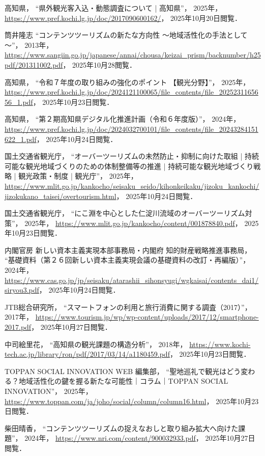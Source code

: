 \documentclass{docs}
\begin{document}
\begin{thebibliography}{99}
	高知県，
	“県外観光客入込・動態調査について | 高知県”，
	2025年，
	\url{https://www.pref.kochi.lg.jp/doc/2017090600162/}，
	2025年10月20日閲覧．

	筒井隆志
	“コンテンツツーリズムの新たな方向性 ～地域活性化の手法として～”，
	2013年，
	\url{https://www.sangiin.go.jp/japanese/annai/chousa/keizai_prism/backnumber/h25pdf/201311002.pdf}，
	2025年10月28閲覧．

	高知県，
	“令和７年度の取り組みの強化のポイント 【観光分野】”，
	2025年，
	\url{https://www.pref.kochi.lg.jp/doc/2024121100065/file_contents/file_2025231165656_1.pdf}，
	2025年10月23日閲覧．

	高知県，
	“第２期高知県デジタル化推進計画（令和６年度版）”，
	2024年，
	\url{https://www.pref.kochi.lg.jp/doc/2024032700101/file_contents/file_20243284151622_1.pdf}，
	2025年10月24日閲覧．

	国土交通省観光庁，
	“オーバーツーリズムの未然防止・抑制に向けた取組 | 持続可能な観光地域づくりのための体制整備等の推進 | 持続可能な観光地域づくり戦略 | 観光政策・制度 | 観光庁”，
	2025年，
	\url{https://www.mlit.go.jp/kankocho/seisaku_seido/kihonkeikaku/jizoku_kankochi/jizokukano_taisei/overtourism.html}，
	2025年10月24日閲覧．

	国土交通省観光庁，
	“にこ淵を中心とした仁淀川流域のオーバーツーリズム対策”，
	2025年，
	\url{https://www.mlit.go.jp/kankocho/content/001878840.pdf}，
	2025年10月23日閲覧．

	内閣官房 新しい資本主義実現本部事務局・内閣府 知的財産戦略推進事務局，
	“基礎資料（第２６回新しい資本主義実現会議の基礎資料の改訂・再編版）”，
	2024年，
	\url{https://www.cas.go.jp/jp/seisaku/atarashii_sihonsyugi/wgkaisai/contents_dai1/siryou3.pdf}，
	2025年10月24日閲覧．

	JTB総合研究所，
	“スマートフォンの利用と旅行消費に関する調査（2017）”，
	2017年，
	\url{https://www.tourism.jp/wp/wp-content/uploads/2017/12/smartphone-2017.pdf}，
	2025年10月27日閲覧．

	中司絵里花，
	“高知県の観光課題の構造分析”，
	2018年，
	\url{https://www.kochi-tech.ac.jp/library/ron/pdf/2017/03/14/a1180459.pdf}，
	2025年10月23日閲覧．

	TOPPAN SOCIAL INNOVATION WEB 編集部，
	“聖地巡礼で観光はどう変わる？地域活性化の鍵を握る新たな可能性｜コラム｜TOPPAN SOCIAL INNOVATION”，
	2025年，
	\url{https://www.toppan.com/ja/joho/social/column/column16.html}，
	2025年10月23日閲覧．

	柴田晴香，
	“コンテンツツーリズムの捉えなおしと取り組み拡大へ向けた課題”，
	2024年，
	\url{https://www.nri.com/content/900032933.pdf}，
	2025年10月27日閲覧．
\end{thebibliography}
\end{document}
